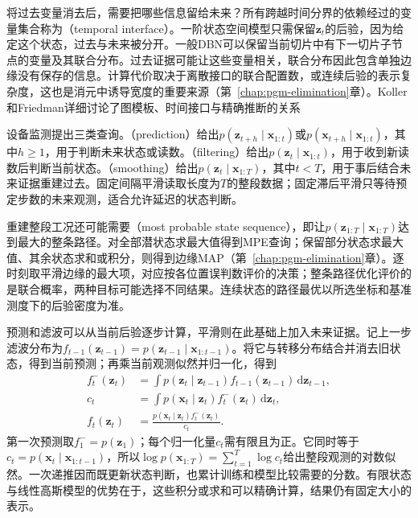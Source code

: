 将过去变量消去后，需要把哪些信息留给未来？所有跨越时间分界的依赖经过的变量集合称为（temporal interface）。一阶状态空间模型只需保留$\bm{z}_t$的后验，因为给定这个状态，过去与未来被分开。一般DBN可以保留当前切片中有下一切片子节点的变量及其联合分布。过去证据可能让这些变量相关，联合分布因此包含单独边缘没有保存的信息。计算代价取决于离散接口的联合配置数，或连续后验的表示复杂度，这也是消元中诱导宽度的重要来源（第~\ref{chap:pgm-elimination}章）。Koller和Friedman详细讨论了图模板、时间接口与精确推断的关系

设备监测提出三类查询。（prediction）给出$p(\bm{z}_{t+h}\mid\bm{x}_{1:t})$或$p(\bm{x}_{t+h}\mid\bm{x}_{1:t})$，其中$h\geq1$，用于判断未来状态或读数。（filtering）给出$p(\bm{z}_t\mid\bm{x}_{1:t})$，用于收到新读数后判断当前状态。（smoothing）给出$p(\bm{z}_t\mid\bm{x}_{1:T})$，其中$t<T$，用于事后结合未来证据重建过去。固定间隔平滑读取长度为$T$的整段数据；固定滞后平滑只等待预定步数的未来观测，适合允许延迟的状态判断。

重建整段工况还可能需要（most probable state sequence），即让$p(\bm{z}_{1:T}\mid\bm{x}_{1:T})$达到最大的整条路径。对全部潜状态求最大值得到MPE查询；保留部分状态求最大值、其余状态求和或积分，则得到边缘MAP（第~\ref{chap:pgm-elimination}章）。逐时刻取平滑边缘的最大项，对应按各位置误判数评价的决策；整条路径优化评价的是联合概率，两种目标可能选择不同结果。连续状态的路径最优以所选坐标和基准测度下的后验密度为准。

预测和滤波可以从当前后验逐步计算，平滑则在此基础上加入未来证据。记上一步滤波分布为$f_{t-1}(\bm{z}_{t-1})=p(\bm{z}_{t-1}\mid\bm{x}_{1:t-1})$。将它与转移分布结合并消去旧状态，得到当前预测；再乘当前观测似然并归一化，得到
\begin{equation}
  \begin{aligned}
    f_t^{-}(\bm{z}_t)
      &=\int p(\bm{z}_t\mid\bm{z}_{t-1})
        f_{t-1}(\bm{z}_{t-1})\,\mathrm{d}\bm{z}_{t-1},\\
    c_t
      &=\int p(\bm{x}_t\mid\bm{z}_t)
        f_t^{-}(\bm{z}_t)\,\mathrm{d}\bm{z}_t,\\
    f_t(\bm{z}_t)
      &=\frac{p(\bm{x}_t\mid\bm{z}_t)
        f_t^{-}(\bm{z}_t)}{c_t}.
  \end{aligned}
  \label{eq:pgm-dynamic-bayes-filter}
\end{equation}
第一次预测取$f_1^{-}=p(\bm{z}_1)$；每个归一化量$c_t$需有限且为正。它同时等于$c_t=p(\bm{x}_t\mid\bm{x}_{1:t-1})$，所以$\log p(\bm{x}_{1:T})=\sum_{t=1}^{T}\log c_t$给出整段观测的对数似然。一次递推因而既更新状态判断，也累计训练和模型比较需要的分数。有限状态与线性高斯模型的优势在于，这些积分或求和可以精确计算，结果仍有固定大小的表示。

